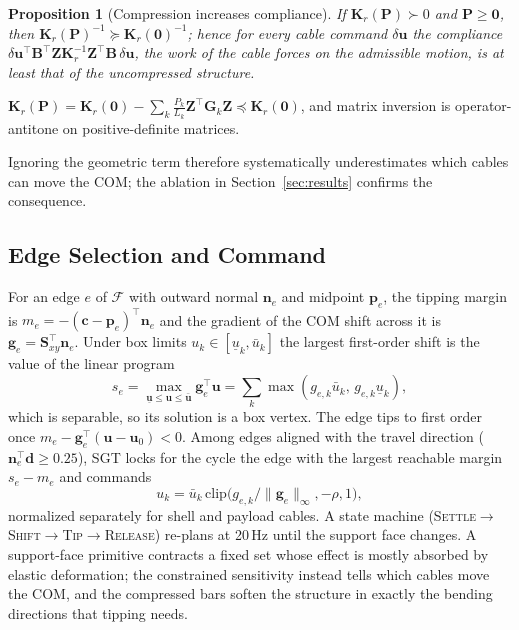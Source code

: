 \documentclass[letterpaper,10pt,conference]{IEEEtran}
\newcommand{\vect}[1]{\boldsymbol{#1}}
\newtheorem{proposition}{Proposition}
\begin{document}
\begin{proposition}[Compression increases compliance]\label{prop:compliance}
If $\vect K_r(\vect P)\succ0$ and $\vect P\ge\vect 0$, then
$\vect K_r(\vect P)^{-1}\succeq\vect K_r(\vect 0)^{-1}$; hence for every
cable command $\delta\vect u$ the compliance
$\delta\vect u^\top\vect B^\top\vect Z\vect K_r^{-1}\vect Z^\top\vect B\,\delta\vect u$,
the work of the cable forces on the admissible motion, is at least that
of the uncompressed structure.
\end{proposition}
\begin{IEEEproof}
$\vect K_r(\vect P)=\vect K_r(\vect 0)-\sum_k\tfrac{P_k}{L_k}\vect Z^\top\vect G_k\vect Z\preceq\vect K_r(\vect 0)$,
and matrix inversion is operator-antitone on positive-definite matrices.
\end{IEEEproof}

\noindent Ignoring the geometric term therefore systematically
underestimates which cables can move the COM; the ablation in
Section~\ref{sec:results} confirms the consequence.

\subsection{Edge Selection and Command}
For an edge $e$ of $\mathcal F$ with outward normal $\vect n_e$ and
midpoint $\vect p_e$, the tipping margin is
$m_e=-(\vect c-\vect p_e)^\top\vect n_e$ and the gradient of the COM
shift across it is $\vect g_e=\vect S_{xy}^\top\vect n_e$. Under box
limits $u_k\in[\underline u_k,\bar u_k]$ the largest first-order shift is
the value of the linear program
\begin{equation}
s_e=\max_{\underline{\vect u}\le\vect u\le\bar{\vect u}}\vect g_e^\top\vect u
=\textstyle\sum_k\max(g_{e,k}\bar u_k,\,g_{e,k}\underline u_k),
\label{eq:lp}
\end{equation}
which is separable, so its solution is a box vertex. The edge tips to
first order once $m_e-\vect g_e^\top(\vect u-\vect u_0)<0$. Among edges
aligned with the travel direction ($\vect n_e^\top\vect d\ge0.25$), SGT
locks for the cycle the edge with the largest reachable margin
$s_e-m_e$ and commands
\begin{equation}
u_k=\bar u_k\,\mathrm{clip}\big(g_{e,k}/\|\vect g_e\|_\infty,-\rho,1\big),
\label{eq:sgt}
\end{equation}
normalized separately for shell and payload cables. A state machine
(\textsc{Settle}$\to$\textsc{Shift}$\to$\textsc{Tip}$\to$\textsc{Release})
re-plans at 20\,Hz until the support face changes. A support-face
primitive contracts a fixed set whose effect is mostly absorbed by
elastic deformation; the constrained sensitivity instead tells which
cables move the COM, and the compressed bars soften the structure in
exactly the bending directions that tipping needs.
\end{document}

